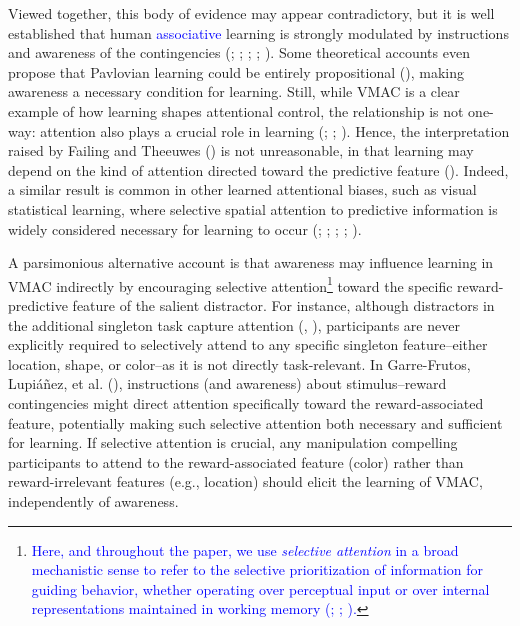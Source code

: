 \documentclass[
  man,
  floatsintext,
  longtable,
  nolmodern,
  notxfonts,
  notimes,
  mask,
  colorlinks=true,linkcolor=blue,citecolor=blue,urlcolor=blue]{apa7}
\begin{document}
Viewed together, this body of evidence may appear contradictory, but it
is well established that human \textcolor{blue}{associative} learning is
strongly modulated by instructions and awareness of the contingencies
(;
;
;
;
). Some theoretical
accounts even propose that Pavlovian learning could be entirely
propositional (),
making awareness a necessary condition for learning. Still, while VMAC
is a clear example of how learning shapes attentional control, the
relationship is not one-way: attention also plays a crucial role in
learning (;
;
). Hence, the
interpretation raised by Failing and Theeuwes
() is not unreasonable, in that learning
may depend on the kind of attention directed toward the predictive
feature ().
Indeed, a similar result is common in other learned attentional biases,
such as visual statistical learning, where selective spatial attention
to predictive information is widely considered necessary for learning to
occur (;
;
;
;
).

A parsimonious alternative account is that awareness may influence
learning in VMAC indirectly by encouraging selective
attention\footnote{\textcolor{blue}{Here, and throughout the paper, we
  use \emph{selective attention} in a broad mechanistic sense to refer
  to the selective prioritization of information for guiding behavior,
  whether operating over perceptual input or over internal
  representations maintained in working memory
  (;
  ;
  ).}} toward the
specific reward-predictive feature of the salient distractor. For
instance, although distractors in the additional singleton task capture
attention (,
), participants are never explicitly
required to selectively attend to any specific singleton feature--either
location, shape, or color--as it is not directly task-relevant. In
Garre-Frutos, Lupiáñez, et al. (),
instructions (and awareness) about stimulus--reward contingencies might
direct attention specifically toward the reward-associated feature,
potentially making such selective attention both necessary and
sufficient for learning. If selective attention is crucial, any
manipulation compelling participants to attend to the reward-associated
feature (color) rather than reward-irrelevant features (e.g., location)
should elicit the learning of VMAC, independently of awareness.
\end{document}
